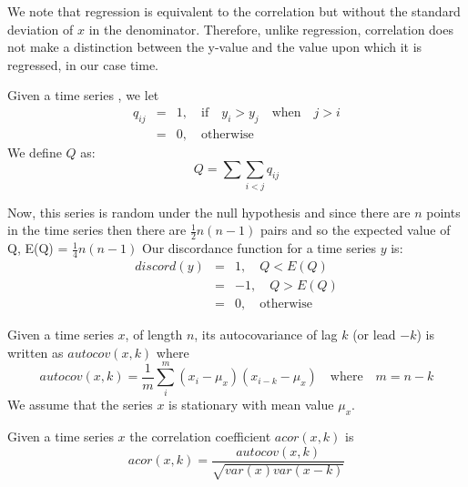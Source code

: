 We note that regression is equivalent to the correlation but without
the standard deviation of $x$ in the denominator. Therefore, unlike
regression, 
correlation does not make a distinction between the y-value and the
value upon which it is regressed, in our case time.

\begin{definition}\label{def:disccoef}
\begin{rm}
Given a time series , we let
\begin{eqnarray*}
q_{ij} & = & 1, \quad\mbox{if}\quad y_i > y_j \quad\mbox{when}\quad j > i \\
       & = & 0, \quad\mbox{otherwise}
\end{eqnarray*}
We define $Q$ as:
\[
Q = \sum \sum_{\!\!\!\!\!\!\!\!\!\!\!i < j} q_{ij}
\]

Now, this series is random under the null hypothesis and since there
are $n$ points in the time series then there are $\frac{1}{2} n(n-1)$
pairs and so the expected value of Q, E(Q) = $\frac{1}{4} n(n-1)$
Our discordance function for a time series $y$ is:
\begin{eqnarray*}
discord(y) & = & 1,  \quad Q < E(Q) \\
      	   & = & -1, \quad Q > E(Q) \\
	   & = & 0,  \quad \mbox{otherwise} 
\end{eqnarray*}
\end{rm}
\end{definition}


\begin{definition}[Autocovariance]\label{def:autocovar}
\begin{rm}
Given a time series $x$, of length $n$, its autocovariance of lag $k$
(or lead $-k$) is written as $autocov(x,k)$ where
\[
autocov(x,k) = \frac{1}{m} \sum_i^m (x_i - \mu_x) (x_{i-k} -
\mu_{x})\quad\mbox{where}\quad m = n-k 
\]
We assume that the series $x$ is stationary with mean value $\mu_x$.
\end{rm}
\end{definition}


\begin{definition}\label{def:autocorrel}
\begin{rm}
Given a time series $x$ the correlation coefficient $acor(x,k)$ is
\[
acor(x,k) = \frac{autocov(x,k)}{\sqrt{var(x)var(x-k)}}
\]
\end{rm}
\end{definition}


